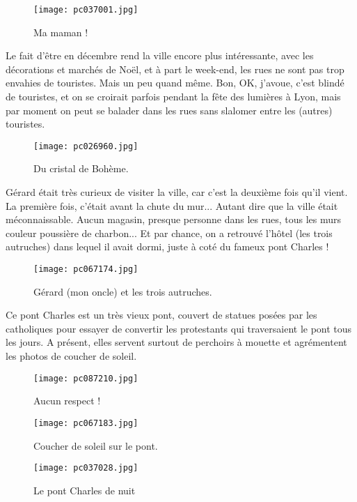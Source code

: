 \documentclass{book}
\begin{document}
\begin{figure}[h]
\centering
\texttt{[image: pc037001.jpg]}
\caption*{Ma maman !}
\end{figure}

Le fait d'être en décembre rend la ville encore plus intéressante, avec les décorations et marchés de Noël, et à part le week-end, les rues ne sont pas trop envahies de touristes. Mais un peu quand même. Bon, OK, j'avoue, c'est blindé de touristes, et on se croirait parfois pendant la fête des lumières à Lyon, mais par moment on peut se balader dans les rues sans slalomer entre les (autres) touristes.


\begin{figure}[h]
\centering
\texttt{[image: pc026960.jpg]}
\caption*{Du cristal de Bohème.}
\end{figure}

Gérard était très curieux de visiter la ville, car c'est la deuxième fois qu'il vient. La première fois, c'était avant la chute du mur... Autant dire que la ville était méconnaissable. Aucun magasin, presque personne dans les rues, tous les murs couleur poussière de charbon... Et par chance, on a retrouvé l'hôtel (les trois autruches) dans lequel il avait dormi, juste à coté du fameux pont Charles !


\begin{figure}[h]
\centering
\texttt{[image: pc067174.jpg]}
\caption*{Gérard (mon oncle) et les trois autruches.}
\end{figure}

Ce pont Charles est un très vieux pont, couvert de statues posées par les catholiques pour essayer de convertir les protestants qui traversaient le pont tous les jours. A présent, elles servent surtout de perchoirs à mouette et agrémentent les photos de coucher de soleil.




\begin{figure}[h]
\centering
\texttt{[image: pc087210.jpg]}
\caption*{Aucun respect !}
\end{figure}


\begin{figure}[h]
\centering
\texttt{[image: pc067183.jpg]}
\caption*{Coucher de soleil sur le pont.}
\end{figure}


\begin{figure}[h]
\centering
\texttt{[image: pc037028.jpg]}
\caption*{Le pont Charles de nuit}
\end{figure}
\end{document}
